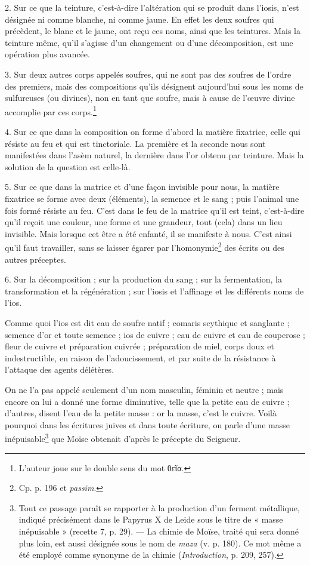 \documentclass[a4paper, 11pt, oneside, polutonikogreek, french]{article}
\begin{document}
2. Sur ce que la teinture, c'est-à-dire l'altération qui se produit dans l'iosis, n'est désignée ni comme blanche, ni comme jaune. En effet les deux soufres qui précèdent, le blanc et le jaune, ont reçu ces noms, ainsi que les teintures. Mais la teinture même, qu'il s'agisse d'un changement ou d'une décomposition, est une opération plus avancée.

3. Sur deux autres corps appelés soufres, qui ne sont pas des soufres de l'ordre des premiers, mais des compositions qu'ils désignent aujourd'hui sous les noms de sulfureuses (ou divines), non en tant que soufre, mais à cause de l'œuvre divine accomplie par ces corps.\footnote{L'auteur joue sur le double sens du mot θεῖα.}

4. Sur ce que dans la composition on forme d'abord la matière fixatrice, celle qui résiste au feu et qui est tinctoriale. La première et la seconde nous sont manifestées dans l'asèm naturel, la dernière dans l'or obtenu par teinture. Mais la solution de la question est celle-là.

5. Sur ce que dans la matrice et d'une façon invisible pour nous, la matière fixatrice se forme avec deux (éléments), la semence et le sang ; puis l'animal une fois formé résiste au feu. C'est dans le feu de la matrice qu'il est teint, c'est-à-dire qu'il reçoit une couleur, une forme et une grandeur, tout (cela) dans un lieu invisible. Mais lorsque cet être a été enfanté, il se manifeste à nous. C'est ainsi qu'il faut travailler, sans se laisser égarer par l'homonymie\footnote{Cp. p. 196 et \emph{passim}.} des écrits ou des autres préceptes.

6. Sur la décomposition ; sur la production du sang ; sur la fermentation, la transformation et la régénération ; sur l'iosis et l'affinage et les différents noms de l'ios.

Comme quoi l'ios est dit eau de soufre natif ; comaris scythique et sanglante ; semence d'or et toute semence ; ios de cuivre ; eau de cuivre et eau de couperose ; fleur de cuivre et préparation cuivrée ; préparation de miel, corps doux et indestructible, en raison de l'adoucissement, et par suite de la résistance à l'attaque des agents délétères.

On ne l'a pas appelé seulement d'un nom masculin, féminin et neutre ; mais encore on lui a donné une forme diminutive, telle que la petite eau de cuivre ; d'autres, disent l'eau de la petite masse : or la masse, c'est le cuivre. Voilà pourquoi dans les écritures juives et dans toute écriture, on parle d'une masse inépuisable\footnote{Tout ce passage paraît se rapporter à la production d'un ferment métallique, indiqué précisément dans le Papyrus X de Leide sous le titre de « masse inépuisable » (recette 7, p. 29). --- La chimie de Moïse, traité qui sera donné plus loin, est aussi désignée sous le nom de \emph{maza} (v. p. 180). Ce mot même a été employé comme synonyme de la chimie (\emph{Introduction}, p. 209, 257).} que Moïse obtenait d'après le précepte du Seigneur.
\end{document}
